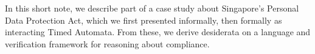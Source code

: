 In this short note, we describe part of a case study about Singapore's
Personal Data Protection Act, which we first presented informally, then
formally as interacting Timed Automata. From these, we derive desiderata on a
language and verification framework for reasoning about compliance.


